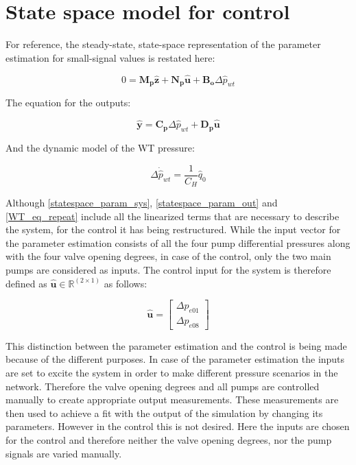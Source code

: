 \section{State space model for control}
 \label{SystemLin_control}
 
For reference, the steady-state, state-space representation of the parameter estimation for small-signal values is restated here:
 
 \begin{equation}
 0 = \bm{M_p} \bm{\hat{z}} + \bm{N_p} \bm{\hat{u}} + \bm{B_o} \Delta \hat{p}_{wt}    
 \label{statespace_param_sys}
\end{equation}

The equation for the outputs:

\begin{equation}
  \bm{\hat{y}} = \bm{C_p} \Delta \hat{p}_{wt} + \bm{D_p} \bm{\hat{u}} 
   \label{statespace_param_out}
\end{equation}

And the dynamic model of the WT pressure:

\begin{equation}
\Delta \dot{\hat{p}}_{wt} = \frac{1}{C_H} \hat{q}_0
 \label{WT_eq_repeat}
\end{equation}

Although \eqref{statespace_param_sys}, \eqref{statespace_param_out} and \eqref{WT_eq_repeat} include all the linearized terms that are necessary to describe the system, for the control it has being restructured. While the input vector for the parameter estimation consists of all the four pump differential pressures along with the four valve opening degrees, in case of the control, only the two main pumps are considered as inputs. The control input for the system is therefore defined as $\bm{\hat{u}} \in \pmb{\mathbb{R}}^{(2 \times 1)}$ as follows: 

\begin{equation}
\bm{\hat{u}} =
\begin{bmatrix} 
\Delta p_{e01} \\
\Delta p_{e08} 
\label{inputvector_control}
\end{bmatrix} 
\end{equation}

This distinction between the parameter estimation and the control is being made because of the different purposes. In case of the parameter estimation the inputs are set to excite the system in order to make different pressure scenarios in the network. Therefore the valve opening degrees and all pumps are controlled manually to create appropriate output measurements. These measurements are then used to achieve a fit with the output of the simulation by changing its parameters. However in the control this is not desired. Here the inputs are chosen for the control and therefore neither the valve opening degrees, nor the pump signals are varied manually. 

